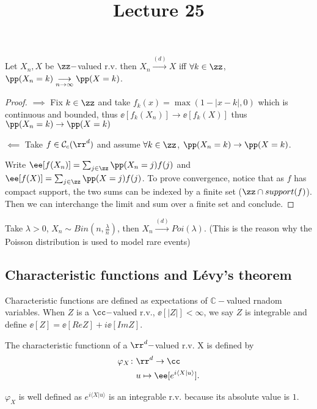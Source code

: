 \documentclass[../main.tex]{subfiles}
\title{Lecture 25}
\begin{document}
\begin{corollary}
  Let $X_n, X$ be $\zz-$valued r.v. then $X_n \overset{(d)}{\longrightarrow}
  X$ iff $\forall k \in \zz$, $\pp(X_n = k) \underset{n \to
  \infty}{\longrightarrow} \pp(X = k)$.
\end{corollary}
\begin{proof}
  $\boxed{\implies}$ Fix $k \in \zz$ and take $f_k(x) = \max(1 - |x - k|, 0)$
  which is continuous and bounded, thus $\ee[f_k(X_n)] \to \ee[f_k(X)]$ thus
  $\pp(X_n = k) \to \pp(X = k)$

  \vspace{0.5em}
  \noindent
  $\boxed{\impliedby}$ Take $f \in \mathcal{C}_c(\rr^d)$ and assume $\forall k
  \in \zz$, $\pp(X_n = k) \to \pp(X = k)$.

  Write $\ee[f(X_n)] = \sum_{j \in \zz} \pp(X_n = j)f(j)$ and $\ee[f(X)] = \sum_{j
  \in \zz} \pp(X = j)f(j)$. To prove convergence, notice that as $f$ has
  compact support, the two sums can be indexed by a finite set ($\zz \cap
  support(f)$). Then we can interchange the limit and sum over a finite set
  and conclude.
\end{proof}
\begin{application}
  Take $\lambda > 0$, $X_n \sim Bin(n , \frac{\lambda}{n} )$, then $X_n
  \overset{(d)}{\longrightarrow} Poi(\lambda)$.
  (This is the reason why the Poisson distribution is used to model rare
  events)
\end{application}

\subsection{Characteristic functions and Lévy's theorem}

Characteristic functions are defined as expectations of $\mathbb{C}-$valued
rnadom variables. When $Z$ is a $\cc-$valued r.v., $\ee[|Z|] < \infty$, we say
$Z$ is integrable and define $\ee[Z] = \ee[Re Z] + i \ee[Im Z]$.

\begin{definition}
    The characteristic functionn of a $\rr^d-$valued r.v. X is defined by 
    \begin{align*}
      \varphi_X \colon &\rr^d \to \cc \\
      &u \mapsto \ee[e^{i \langle X | u \rangle}]
    .\end{align*} 
\end{definition}
\begin{remark}
    $\varphi_X$ is well defined as $e^{i \langle X | u \rangle}$ is an
    integrable r.v. because its absolute value is $1$.
\end{remark}
\end{document}
